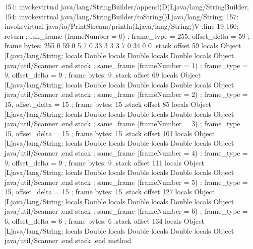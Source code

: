 \documentclass[12pt,a4paper,twoside]{report}
\begin{document}
\begin{terminal}
  151: invokevirtual java/lang/StringBuilder/append(D)Ljava/lang/StringBuilder;
  154: invokevirtual java/lang/StringBuilder/toString()Ljava/lang/String;
  157: invokevirtual java/io/PrintStream/println(Ljava/lang/String;)V
  .line 19
  160: return
  ; full_frame (frameNumber = 0)
  ; frame_type = 255, offset_delta = 59
  ; frame bytes: 255 0 59 0 5 7 0 33 3 3 3 7 0 34 0 0
  .stack
    offset 59
    locals Object [Ljava/lang/String;
    locals Double
    locals Double
    locals Double
    locals Object java/util/Scanner
    .end stack
  ; same_frame (frameNumber = 1)
  ; frame_type = 9, offset_delta = 9
  ; frame bytes: 9
  .stack
    offset 69
    locals Object [Ljava/lang/String;
    locals Double
    locals Double
    locals Double
    locals Object java/util/Scanner
    .end stack
  ; same_frame (frameNumber = 2)
  ; frame_type = 15, offset_delta = 15
  ; frame bytes: 15
  .stack
    offset 85
    locals Object [Ljava/lang/String;
    locals Double
    locals Double
    locals Double
    locals Object java/util/Scanner
    .end stack
  ; same_frame (frameNumber = 3)
  ; frame_type = 15, offset_delta = 15
  ; frame bytes: 15
  .stack
    offset 101
    locals Object [Ljava/lang/String;
    locals Double
    locals Double
    locals Double
    locals Object java/util/Scanner
    .end stack
  ; same_frame (frameNumber = 4)
  ; frame_type = 9, offset_delta = 9
  ; frame bytes: 9
  .stack
    offset 111
    locals Object [Ljava/lang/String;
    locals Double
    locals Double
    locals Double
    locals Object java/util/Scanner
    .end stack
  ; same_frame (frameNumber = 5)
  ; frame_type = 15, offset_delta = 15
  ; frame bytes: 15
  .stack
    offset 127
    locals Object [Ljava/lang/String;
    locals Double
    locals Double
    locals Double
    locals Object java/util/Scanner
    .end stack
  ; same_frame (frameNumber = 6)
  ; frame_type = 6, offset_delta = 6
  ; frame bytes: 6
  .stack
    offset 134
    locals Object [Ljava/lang/String;
    locals Double
    locals Double
    locals Double
    locals Object java/util/Scanner
    .end stack
.end method


\end{terminal}
\end{document}
